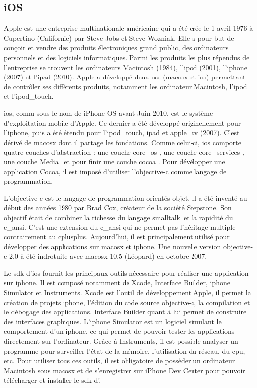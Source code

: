 \subsection{iOS}
	Apple est une entreprise multinationale américaine qui a été crée le 1
	avril 1976 à Cupertino (Californie) par Steve Jobs et Steve Wozniak. Elle a
	pour but de conçoir et vendre des produits électroniques grand public, des
	ordinateurs personnels et des logiciels informatiques. Parmi les produits les
	plus répendus de l'entreprise se trouvent les ordinateurs Macintosh (1984),
	l'\gls{ipod} (2001), l'\gls{iphone} (2007) et l'\gls{ipad} (2010). Apple a
	développé deux \glspl{os} (\gls{macosx} et \gls{ios})
	permettant de contrôler ses différents produits, notamment les ordinateur 
	Macintosh, l'\gls{ipod} et l'\gls{ipod_touch}.
			
	\gls{ios}, connu sous le nom de iPhone OS avant Juin 2010, est le \gls{système
	d'exploitation}  mobile d'Apple. Ce dernier a été développé originellement 
	pour l'\gls{iphone}, puis a été étendu pour l'\gls{ipod_touch}, \gls{ipad} et
	\gls{apple_tv} (2007). C'est dérivé de \gls{macosx}  dont il partage les 
	fondations. Comme celui-ci, \gls{ios} comporte quatre couches d'abstraction : une
	couche \og \gls{core_os} \fg, une couche \og \gls{core_services} \fg, une
	couche \og Media \fg \, et pour finir une couche \og \gls{cocoa} \fg. Pour
	dévélopper une application Cocoa, il est imposé d'utiliser l'\gls{objective-c} comme
	langage de programmation.
			
	L'\gls{objective-c} est le langage de programmation orientés objet. Il a été inventé
	au début des années 1980 par Brad Cox, créateur de la société Stepstone. Son
	objectif était de combiner la richesse du langage \gls{smalltalk}\, et la
	rapidité du \gls{c_ansi}. 
	C'est une extension du \gls{c_ansi} qui ne permet pas l'héritage multiple
	contrairement au \gls{cplusplus}. Aujourd'hui, il est principalement utilisé
	pour développer des applications sur \gls{macosx} et \gls{iphone}. Une nouvelle version
	\gls{objective-c} 2.0 à été indrotuite avec \gls{macosx} 10.5 (Léopard) en octobre 2007.
			
	Le \gls{sdk} d'\gls{ios} fournit les principaux outils nécessaire pour
	réaliser une application sur \gls{iphone}. Il est composé notamment de Xcode,
	Interface Builder, \gls{iphone} Simulator et Instruments. Xcode est l'outil de
	développement Apple, il permet la création de projets \gls{iphone}, l’édition du code
	source \gls{objective-c}, la compilation et le débogage des applications. Interface
	Builder quant à lui permet de construire des interfaces graphiques. L'\gls{iphone}
	Simulator est un logiciel simulant le comportement d'un \gls{iphone}, ce qui 
	permet de pouvoir tester les applications directement sur l'ordinateur. Grâce
	à Instruments, il est possible analyser un programme pour surveiller l’état de la
	mémoire, l’utilisation du réseau, du \gls{cpu}, etc. Pour utiliser tous ces outils,
	il est obligatoire de possèder un ordinateur Macintosh sous \gls{macosx} et de
	s'enregistrer sur iPhone Dev Center pour pouvoir télécharger et installer le \gls{sdk} d'.
